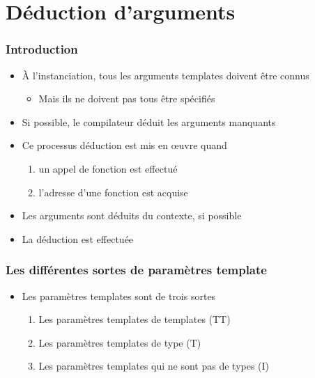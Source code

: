 \section{Déduction d'arguments}

\begin{frame}
\frametitle{Introduction}
\begin{itemize}[<+->]
\item À l'instanciation, tous les arguments templates doivent être connus
	\begin{itemize}
	\item Mais ils ne doivent pas tous être spécifiés
	\end{itemize}
\item Si possible, le compilateur déduit les arguments manquants
\item Ce processus déduction est mis en œuvre quand
	\begin{enumerate}
	\item un appel de fonction est effectué
	\item l'adresse d'une fonction est acquise
	\end{enumerate}
\item Les arguments sont déduits du contexte, si possible
\item La déduction est effectuée 
\end{itemize}
\end{frame}

\begin{frame}
\frametitle{Les différentes sortes de paramètres template}
\begin{itemize}
 \item Les paramètres templates sont de trois sortes
	\begin{enumerate}
	 \item Les paramètres templates de templates (TT)
	\onslide<3-> \item Les paramètres templates de type (T)	
	\onslide<4-> \item Les paramètres templates qui ne sont pas de types (I)
	\end{enumerate}
\end{itemize}
\begin{center}
\end{center}
\end{frame}

